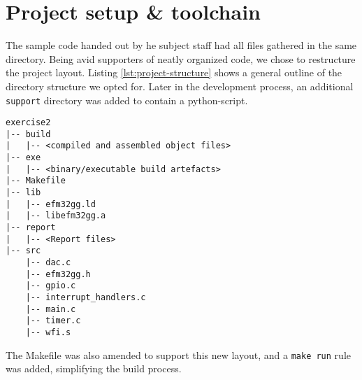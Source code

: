 \section{Project setup \& toolchain}

The sample code handed out by he subject staff had all files gathered in the same directory. Being avid supporters of neatly organized code, we chose to restructure the project layout. Listing \ref{lst:project-structure} shows a general outline of the directory structure we opted for. Later in the development process, an additional \texttt{support} directory was added to contain a python-script.

\begin{lstlisting}[label=lst:project-structure, caption=Revised project structure]
exercise2
|-- build
|   |-- <compiled and assembled object files>
|-- exe
|   |-- <binary/executable build artefacts>
|-- Makefile
|-- lib
|   |-- efm32gg.ld
|   |-- libefm32gg.a
|-- report
|   |-- <Report files>
|-- src
    |-- dac.c
    |-- efm32gg.h
    |-- gpio.c
    |-- interrupt_handlers.c
    |-- main.c
    |-- timer.c
    |-- wfi.s
\end{lstlisting}

The Makefile was also amended to support this new layout, and a \texttt{make run} rule was added, simplifying the build process.

